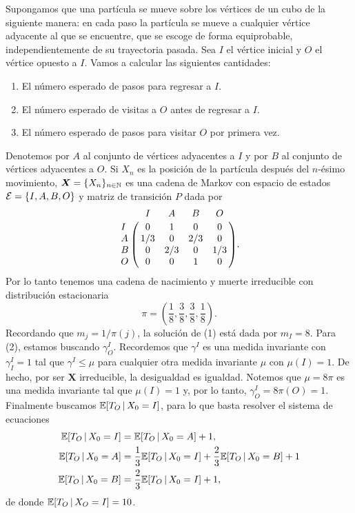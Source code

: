 \begin{example}
    Supongamos que una partícula se mueve sobre los vértices de un cubo de la siguiente manera: en cada paso la partícula se mueve a cualquier vértice adyacente al que se encuentre, que se escoge de forma equiprobable, independientemente de su trayectoria pasada. Sea $I$ el vértice inicial y $O$ el vértice opuesto a $I$. Vamos a calcular las siguientes cantidades:
    \begin{enumerate}
        \item El número esperado de pasos para regresar a $I$.
        \item El número esperado de visitas a $O$ antes de regresar a $I$.
        \item El número esperado de pasos para visitar $O$ por primera vez.
    \end{enumerate}
    Denotemos por $A$ al conjunto de vértices adyacentes a $I$ y por $B$ al conjunto de vértices adyacentes a $O$. Si $X_n$ es la posición de la partícula después del $n$-ésimo movimiento, $\bm X = \{X_n\}_{n \in \mathbb{N}}$ es una cadena de Markov con espacio de estados $\mathcal{E} = \{I, A, B, O\}$ y matriz de transición $P$ dada por
    \[
        \bordermatrix{
            & I & A & B & O \cr
            I & 0 & 1 & 0 & 0 \cr
            A & 1/3 & 0 & 2/3 & 0 \cr
            B & 0 & 2/3 & 0 & 1/3 \cr
            O & 0 & 0 & 1 & 0
        }.
    \] Por lo tanto tenemos una cadena de nacimiento y muerte irreducible con distribución estacionaria 
    \[
        \pi = \left(\frac 1 8, \frac 3 8, \frac 3 8, \frac 1 8\right).
    \]
    Recordando que $m_j = 1/\pi(j)$, la solución de (1) está dada por $m_I = 8$. Para (2), estamos buscando $\gamma_O^I$. Recordemos que $\gamma^I$ es una medida invariante con $\gamma_I^I = 1$ tal que $\gamma^I \leq \mu$ para cualquier otra medida invariante $\mu$ con $\mu(I) = 1$. De hecho, por ser $\bm X$ irreducible, la desigualdad es igualdad. Notemos que $\mu = 8\pi$ es una medida invariante tal que $\mu(I) = 1$ y, por lo tanto, $\gamma_O^I = 8 \pi(O) = 1$. Finalmente buscamos $\mathbb{E}[T_O \,\vert\, X_0 = I]$, para lo que basta resolver el sistema de ecuaciones
    \begin{align*}
        \mathbb{E}[T_O \,\vert\, X_0 = I] & = \mathbb{E}[T_O \,\vert\, X_0 = A] + 1, \\
        \mathbb{E}[T_O \,\vert\, X_0 = A] & = \frac 1 3 \mathbb{E}[T_O \,\vert\, X_0 = I] + \frac 2 3 \mathbb{E}[T_O \,\vert\, X_0 = B] + 1 \\
        \mathbb{E}[T_O \,\vert\, X_0 = B] & = \frac 2 3 \mathbb{E}[T_O \,\vert\, X_0 = I] + 1,
    \end{align*}
    de donde $\mathbb{E}[T_O \,\vert\, X_O = I] = 10$.
\end{example}

